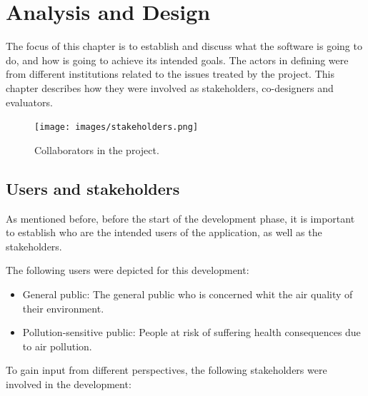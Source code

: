\chapter{Analysis and Design}
The focus of this chapter is to establish and discuss what the software is going to do, and how is going to achieve its intended goals. The actors in defining were from different institutions related to the issues treated by the project. This chapter describes how they were involved as stakeholders, co-designers and evaluators. 

\begin{figure}[h]
\begin{adjustbox}{width=1\textwidth,center=\textwidth}
  \centering
  \texttt{[image: images/stakeholders.png]}
\end{adjustbox}
  \caption[Colaborators in the project]{Collaborators in the project.}
  \label{fig:stakeholders}
\end{figure}

\section{Users and stakeholders}
As mentioned before, before the start of the development phase, it is important to establish who are the intended users of the application, as well as the stakeholders. 

The following users were depicted for this development:

\begin{itemize}
    \item General public: The general public who is concerned whit the air quality of their environment.
    \item Pollution-sensitive public: People at risk of suffering health consequences due to air pollution.
\end{itemize}

To gain input from different perspectives, the following stakeholders were involved in the development: 

